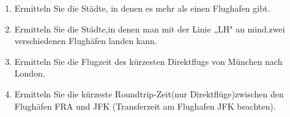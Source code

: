 \documentclass{lehramt-informatik-aufgabe}
\begin{document}
\begin{enumerate}


\item Ermitteln Sie die Städte, in denen es mehr als einen Flughafen
gibt.


\item Ermitteln Sie die Städte,in denen man mit der Linie „LH" an
mind.zwei verschiedenen Flughäfen landen kann.


\item Ermitteln Sie die Flugzeit des kürzesten Direktflugs von München
nach London.


\item Ermitteln Sie die kürzeste Roundtrip-Zeit(nur Direktflüge)zwischen
den Flughäfen FRA und JFK (Transferzeit am Flughafen JFK beachten).
\end{enumerate}
\end{document}
